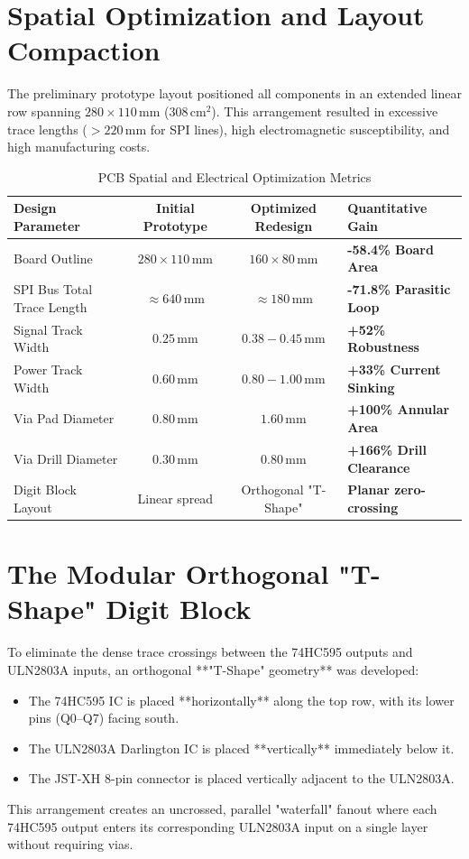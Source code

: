 \documentclass[12pt,a4paper,oneside]{report}
\begin{document}
\section{Spatial Optimization and Layout Compaction}
The preliminary prototype layout positioned all components in an extended linear row spanning $280 \times 110\,\text{mm}$ ($308\,\text{cm}^2$). This arrangement resulted in excessive trace lengths ($> 220\,\text{mm}$ for SPI lines), high electromagnetic susceptibility, and high manufacturing costs.

\begin{table}[H]
\centering
\small
\caption{PCB Spatial and Electrical Optimization Metrics}
\label{tab:pcb_opt}
\begin{tabularx}{\textwidth}{>{\raggedright\arraybackslash}X c c >{\raggedright\arraybackslash}p{4.2cm}}
\toprule
\textbf{Design Parameter} & \textbf{Initial Prototype} & \textbf{Optimized Redesign} & \textbf{Quantitative Gain} \\
\midrule
Board Outline & $280 \times 110\,\text{mm}$ & $160 \times 80\,\text{mm}$ & \textbf{-58.4\% Board Area} \\
SPI Bus Total Trace Length & $\approx 640\,\text{mm}$ & $\approx 180\,\text{mm}$ & \textbf{-71.8\% Parasitic Loop} \\
Signal Track Width & $0.25\,\text{mm}$ & $0.38 - 0.45\,\text{mm}$ & \textbf{+52\% Robustness} \\
Power Track Width & $0.60\,\text{mm}$ & $0.80 - 1.00\,\text{mm}$ & \textbf{+33\% Current Sinking} \\
Via Pad Diameter & $0.80\,\text{mm}$ & $1.60\,\text{mm}$ & \textbf{+100\% Annular Area} \\
Via Drill Diameter & $0.30\,\text{mm}$ & $0.80\,\text{mm}$ & \textbf{+166\% Drill Clearance} \\
Digit Block Layout & Linear spread & Orthogonal "T-Shape" & \textbf{Planar zero-crossing} \\
\bottomrule
\end{tabularx}
\end{table}

\section{The Modular Orthogonal "T-Shape" Digit Block}
To eliminate the dense trace crossings between the 74HC595 outputs and ULN2803A inputs, an orthogonal **"T-Shape" geometry** was developed:
\begin{itemize}
    \item The 74HC595 IC is placed **horizontally** along the top row, with its lower pins (Q0--Q7) facing south.
    \item The ULN2803A Darlington IC is placed **vertically** immediately below it.
    \item The JST-XH 8-pin connector is placed vertically adjacent to the ULN2803A.
\end{itemize}
This arrangement creates an uncrossed, parallel "waterfall" fanout where each 74HC595 output enters its corresponding ULN2803A input on a single layer without requiring vias.
\end{document}
